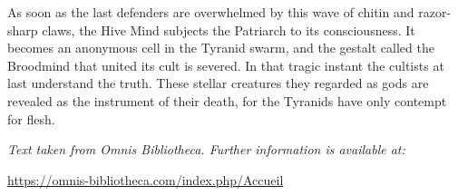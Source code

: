 As soon as the last defenders are overwhelmed by this wave of chitin and razor-sharp claws, the Hive Mind subjects the Patriarch to its consciousness. It becomes an anonymous cell in the Tyranid swarm, and the gestalt called the Broodmind that united its cult is severed. In that tragic instant the cultists at last understand the truth. These stellar creatures they regarded as gods are revealed as the instrument of their death, for the Tyranids have only contempt for flesh.

\medskip

\noindent\textit{Text taken from Omnis Bibliotheca. Further information is available at:}

\noindent\url{https://omnis-bibliotheca.com/index.php/Accueil}
